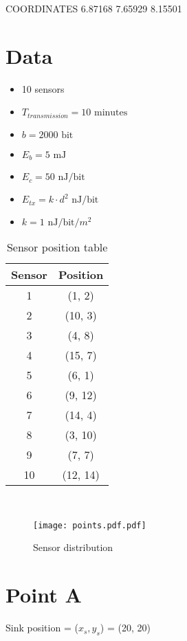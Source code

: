 COORDINATES
6.87168 7.65929 8.15501

\section{Data}
\begin{itemize}
	\item 10 sensors
	\item $T_{transmission} = 10 \text{ minutes}$
	\item $b = 2000 \text{ bit}$
	\item $E_b = 5 \text{ mJ}$
	\item $E_c = 50 \text{ nJ/bit}$
	\item $E_{tx} = k \cdot d^2 \text{ nJ/bit}$
	\item $k = 1 \text{ nJ/bit/$m^2$}$
\end{itemize}
\begin{table}[H]
\centering 
\begin{tabular}{| c | c |}
	\hline 
	\rowcolor{bluepoli!40}
	\textbf{Sensor} & \textbf{Position}\T\B \\
	\hline 
	1 & (1, 2) \T\B\\
	2 &(10, 3) \T\B\\
	3 & (4, 8) \T\B\\
	4 & (15, 7) \T\B\\
	5  & (6, 1) \T\B\\
	6  & (9, 12) \T\B\\
	7  & (14, 4) \T\B\\
	8  & (3, 10) \T\B\\
	9  & (7, 7) \T\B\\
	10  & (12, 14) \T\B\\
	\hline
\end{tabular}
\\[10pt]
\caption{Sensor position table}
\label{table:sensor_position_table}
\end{table}

\begin{figure}[H]
    \centering
    \texttt{[image: points.pdf.pdf]}
    \caption{Sensor distribution}
    \label{fig:Sensor_distribution}
\end{figure}

\section{Point A}
Sink position = ($x_s, y_s$) = (20, 20)\\


